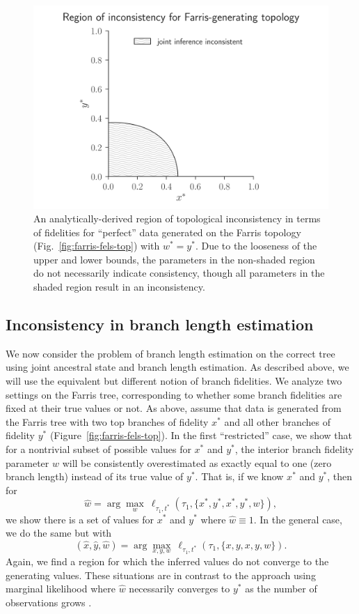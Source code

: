 \documentclass{article}
\begin{document}
\begin{figure}
\centering
\includegraphics[width=\textwidth]{topology-inconsistency-inkscape}
\caption{
    An analytically-derived region of topological inconsistency in terms of fidelities for ``perfect'' data generated on the Farris topology (Fig.~\ref{fig:farris-fels-top}) with $w^* = y^*$.
    Due to the looseness of the upper and lower bounds, the parameters in the non-shaded region do not necessarily indicate consistency, though all parameters in the shaded region result in an inconsistency.
}
\label{fig:inconsistency-farris}
\end{figure}

\subsection*{Inconsistency in branch length estimation}

We now consider the problem of branch length estimation on the correct tree using joint ancestral state and branch length estimation.
As described above, we will use the equivalent but different notion of branch fidelities.
We analyze two settings on the Farris tree, corresponding to whether some branch fidelities are fixed at their true values or not.
As above, assume that data is generated from the Farris tree with two top branches of fidelity $x^*$ and all other branches of fidelity $y^*$ (Figure~\ref{fig:farris-fels-top}).
In the first ``restricted'' case, we show that for a nontrivial subset of possible values for $x^*$ and $y^*$, the interior branch fidelity parameter $w$ will be consistently overestimated as exactly equal to one (zero branch length) instead of its true value of $y^*$.
That is, if we know $x^*$ and $y^*$, then for
$$
\hat{w} = \arg\max_{w} \ \ell_{\tau_1,t^*}(\tau_1, \{x^*,y^*,x^*,y^*,w\}),
$$
we show there is a set of values for $x^*$ and $y^*$ where $\hat{w}\equiv 1$.
In the general case, we do the same but with
$$
(\hat{x}, \hat{y}, \hat{w}) = \arg\max_{x,y,w} \ \ell_{\tau_1,t^*}(\tau_1, \{x,y,x,y,w\}).
$$
Again, we find a region for which the inferred values do not converge to the generating values.
These situations are in contrast to the approach using marginal likelihood where $\hat{w}$ necessarily converges to $y^*$ as the number of observations grows \cite{RoyChoudhury2015-ta}.
\end{document}
